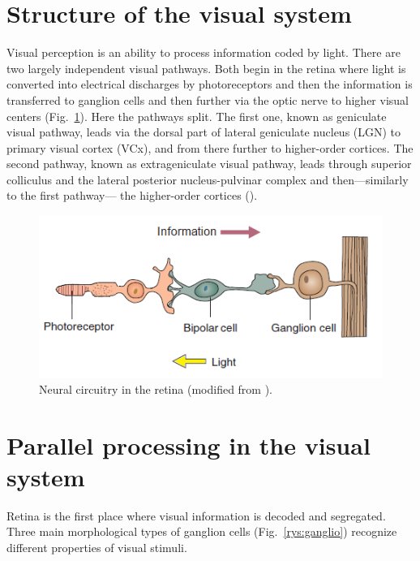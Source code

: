 \documentclass{pracalicmgr}
\begin{document}
   \section{Structure of the visual system}
   Visual perception is an ability to process information coded by light. There are two largely independent visual pathways. Both begin in the retina where light is converted into electrical discharges by photoreceptors and then the information is transferred to ganglion cells and then further via the optic nerve to higher visual centers (Fig.~\ref{rys:neural_circuitry}). Here the pathways split. The first one, known as geniculate visual pathway, leads via the dorsal part of lateral geniculate nucleus (LGN) to primary visual cortex (VCx), and from there further to higher-order cortices. The second pathway, known as extrageniculate visual pathway, leads through superior colliculus and the lateral posterior nucleus-pulvinar complex and then---similarly to the first pathway--- the higher-order cortices (\cite{viola2, thomsonlayer6}). 
   \begin{figure}[htbp]
   	\begin{center}
   		\includegraphics[scale=0.9]{neural_circuitry.png}
   	\end{center}
   	\caption{Neural circuitry in the retina (modified from \cite{carlsonphysiology}).}
   	\label{rys:neural_circuitry}
   \end{figure}      
   
   \section{Parallel processing in the visual system}
   Retina is the first place where visual information is decoded and segregated. Three main morphological types of ganglion cells (Fig.~\ref{rys:ganglio}) recognize different properties of visual stimuli.
   
\end{document}
